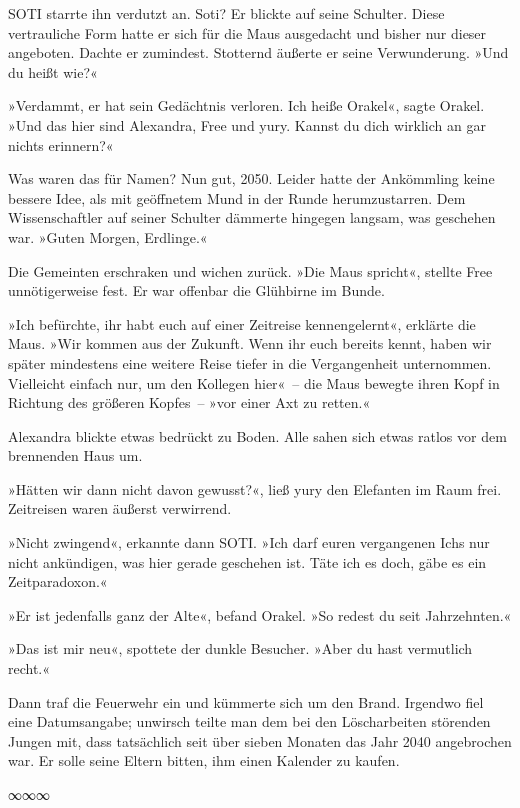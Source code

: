 SOTI starrte ihn verdutzt an. Soti? Er blickte auf seine Schulter. Diese vertrauliche Form hatte er sich für die Maus ausgedacht und bisher nur dieser angeboten. Dachte er zumindest. Stotternd äußerte er seine Verwunderung. »Und du heißt wie?«

»Verdammt, er hat sein Gedächtnis verloren. Ich heiße Orakel«, sagte Orakel. »Und das hier sind Alexandra, Free und yury. Kannst du dich wirklich an gar nichts erinnern?«

Was waren das für Namen? Nun gut, 2050. Leider hatte der Ankömmling keine bessere Idee, als mit geöffnetem Mund in der Runde herumzustarren. Dem Wissenschaftler auf seiner Schulter dämmerte hingegen langsam, was geschehen war. »Guten Morgen, Erdlinge.«

Die Gemeinten erschraken und wichen zurück. »Die Maus spricht«, stellte Free unnötigerweise fest. Er war offenbar die Glühbirne im Bunde.

»Ich befürchte, ihr habt euch auf einer Zeitreise kennengelernt«, erklärte die Maus. »Wir kommen aus der Zukunft. Wenn ihr euch bereits kennt, haben wir später mindestens eine weitere Reise tiefer in die Vergangenheit unternommen. Vielleicht einfach nur, um den Kollegen hier«~– die Maus bewegte ihren Kopf in Richtung des größeren Kopfes~– »vor einer Axt zu retten.«

Alexandra blickte etwas bedrückt zu Boden. Alle sahen sich etwas ratlos vor dem brennenden Haus um.

»Hätten wir dann nicht davon gewusst?«, ließ yury den Elefanten im Raum frei. Zeitreisen waren äußerst verwirrend.

»Nicht zwingend«, erkannte dann SOTI. »Ich darf euren vergangenen Ichs nur nicht ankündigen, was hier gerade geschehen ist. Täte ich es doch, gäbe es ein Zeitparadoxon.«

»Er ist jedenfalls ganz der Alte«, befand Orakel. »So redest du seit Jahrzehnten.«

»Das ist mir neu«, spottete der dunkle Besucher. »Aber du hast vermutlich recht.«

Dann traf die Feuerwehr ein und kümmerte sich um den Brand. Irgendwo fiel eine Datumsangabe; unwirsch teilte man dem bei den Löscharbeiten störenden Jungen mit, dass tatsächlich seit über sieben Monaten das Jahr 2040 angebrochen war. Er solle seine Eltern bitten, ihm einen Kalender zu kaufen.

\begin{center}
∞∞∞
\end{center}

